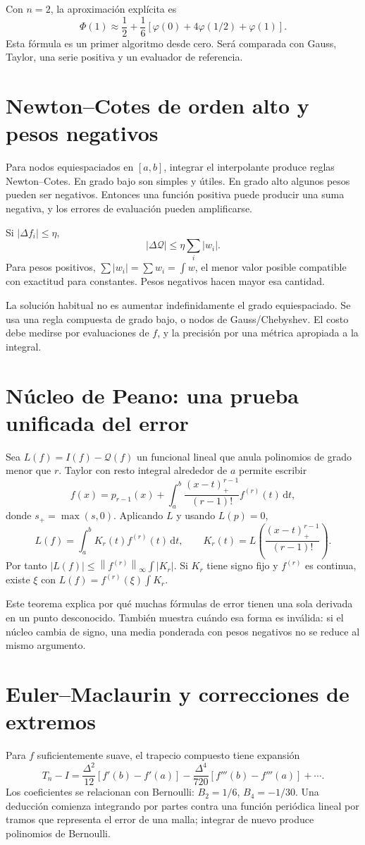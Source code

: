 \documentclass[11pt,a4paper]{article}
\newcommand{\dd}{\,\mathrm d}
\newcommand{\norm}[1]{\left\lVert #1\right\rVert}
\theoremstyle{definition}
\newcommand{\ph}{\varphi}
\begin{document}
Con $n=2$, la aproximación explícita es
\[
\Phi(1)\approx\frac12+\frac16[\ph(0)+4\ph(1/2)+\ph(1)].
\]
Esta fórmula es un primer algoritmo desde cero. Será comparada con Gauss, Taylor, una serie positiva y un evaluador de referencia.

\section{Newton--Cotes de orden alto y pesos negativos}
Para nodos equiespaciados en $[a,b]$, integrar el interpolante produce reglas Newton--Cotes. En grado bajo son simples y útiles. En grado alto algunos pesos pueden ser negativos. Entonces una función positiva puede producir una suma negativa, y los errores de evaluación pueden amplificarse.

Si $|\Delta f_i|\le\eta$,
\[
|\Delta\mathcal Q|\le\eta\sum_i|w_i|.
\]
Para pesos positivos, $\sum|w_i|=\sum w_i=\int w$, el menor valor posible compatible con exactitud para constantes. Pesos negativos hacen mayor esa cantidad.

La solución habitual no es aumentar indefinidamente el grado equiespaciado. Se usa una regla compuesta de grado bajo, o nodos de Gauss/Chebyshev. El costo debe medirse por evaluaciones de $f$, y la precisión por una métrica apropiada a la integral.

\section{Núcleo de Peano: una prueba unificada del error}
Sea $L(f)=I(f)-\mathcal Q(f)$ un funcional lineal que anula polinomios de grado menor que $r$. Taylor con resto integral alrededor de $a$ permite escribir
\[
f(x)=p_{r-1}(x)+\int_a^b
\frac{(x-t)_+^{r-1}}{(r-1)!}f^{(r)}(t)\dd t,
\]
donde $s_+=\max(s,0)$. Aplicando $L$ y usando $L(p)=0$,
\[
L(f)=\int_a^b K_r(t)f^{(r)}(t)\dd t,\qquad
K_r(t)=L\left(\frac{(x-t)_+^{r-1}}{(r-1)!}\right).
\]
Por tanto $|L(f)|\le\norm{f^{(r)}}_\infty\int|K_r|$. Si $K_r$ tiene signo fijo y $f^{(r)}$ es continua, existe $\xi$ con
$L(f)=f^{(r)}(\xi)\int K_r$.

Este teorema explica por qué muchas fórmulas de error tienen una sola derivada en un punto desconocido. También muestra cuándo esa forma es inválida: si el núcleo cambia de signo, una media ponderada con pesos negativos no se reduce al mismo argumento.

\section{Euler--Maclaurin y correcciones de extremos}
Para $f$ suficientemente suave, el trapecio compuesto tiene expansión
\[
T_n-I=\frac{\Delta^2}{12}[f'(b)-f'(a)]
-\frac{\Delta^4}{720}[f'''(b)-f'''(a)]+\cdots.
\]
Los coeficientes se relacionan con Bernoulli: $B_2=1/6$, $B_4=-1/30$. Una deducción comienza integrando por partes contra una función periódica lineal por tramos que representa el error de una malla; integrar de nuevo produce polinomios de Bernoulli.
\end{document}
